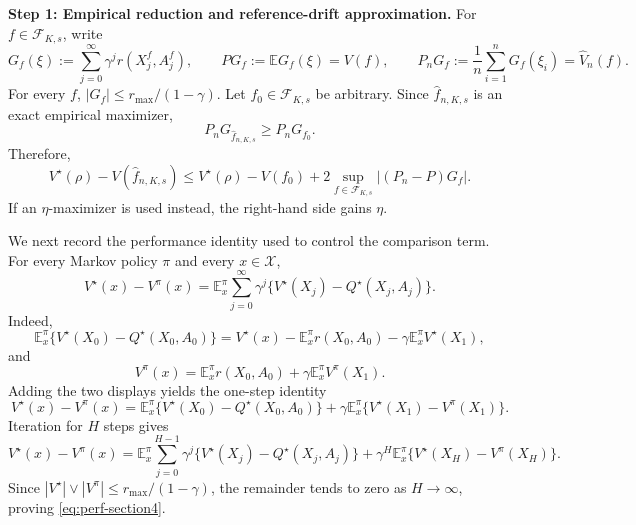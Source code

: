 \documentclass{article}
\newcommand{\1}{\mathbbm{1}}
\numberwithin{equation}{section}
\def\to{\rightarrow}
\begin{document}
\medskip
\noindent\textbf{Step 1: Empirical reduction and reference-drift approximation.}
For \(f\in\mathcal F_{K,s}\), write
\[
G_f(\xi):=\sum_{j=0}^{\infty}\gamma^j r(X_j^f,A_j^f),
\qquad
PG_f:=\mathbb E G_f(\xi)=V(f),
\qquad
P_nG_f:=\frac1n\sum_{i=1}^nG_f(\xi_i)=\widehat V_n(f).
\]
For every \(f\), \(|G_f|\le r_{\max}/(1-\gamma)\). Let \(f_0\in\mathcal F_{K,s}\) be arbitrary. Since \(\widehat f_{n,K,s}\) is an exact empirical maximizer,
\[
P_nG_{\widehat f_{n,K,s}}\ge P_nG_{f_0}.
\]
Therefore,
\begin{equation}
\label{eq:erm-section4}
 V^\star(\rho)-V(\widehat f_{n,K,s})
 \le
 V^\star(\rho)-V(f_0)
 +2\sup_{f\in\mathcal F_{K,s}}\left|(P_n-P)G_f\right|.
\end{equation}
If an \(\eta\)-maximizer is used instead, the right-hand side gains \(\eta\).

\medskip

We next record the performance identity used to control the comparison term. For every Markov policy \(\pi\) and every \(x\in\mathcal X\),
\begin{equation}
\label{eq:perf-section4}
 V^\star(x)-V^\pi(x)
 =\mathbb E_x^\pi\sum_{j=0}^\infty
 \gamma^j\{V^\star(X_j)-Q^\star(X_j,A_j)\}.
\end{equation}
Indeed,
\[
 \mathbb E_x^\pi\{V^\star(X_0)-Q^\star(X_0,A_0)\}
 =V^\star(x)-\mathbb E_x^\pi r(X_0,A_0)-\gamma \mathbb E_x^\pi V^\star(X_1),
\]
and
\[
 V^\pi(x)=\mathbb E_x^\pi r(X_0,A_0)+\gamma \mathbb E_x^\pi V^\pi(X_1).
\]
Adding the two displays yields the one-step identity
\[
 V^\star(x)-V^\pi(x)
 =\mathbb E_x^\pi\{V^\star(X_0)-Q^\star(X_0,A_0)\}
 +\gamma \mathbb E_x^\pi\{V^\star(X_1)-V^\pi(X_1)\}.
\]
Iteration for \(H\) steps gives
\[
 V^\star(x)-V^\pi(x)
 =\mathbb E_x^\pi\sum_{j=0}^{H-1}
 \gamma^j\{V^\star(X_j)-Q^\star(X_j,A_j)\}
 +\gamma^H\mathbb E_x^\pi\{V^\star(X_H)-V^\pi(X_H)\}.
\]
Since \(|V^\star|\vee |V^\pi|\le r_{\max}/(1-\gamma)\), the remainder tends to zero as \(H\to\infty\), proving \eqref{eq:perf-section4}.

\medskip
\end{document}

